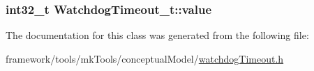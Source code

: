 \subsubsection[{\texorpdfstring{value}{value}}]{\setlength{\rightskip}{0pt plus 5cm}int32\+\_\+t Watchdog\+Timeout\+\_\+t\+::value\hspace{0.3cm}{\ttfamily [private]}}\hypertarget{class_watchdog_timeout__t_a347656fb77c201abda078eb2bd21186f}{}\label{class_watchdog_timeout__t_a347656fb77c201abda078eb2bd21186f}


The documentation for this class was generated from the following file\+:\begin{DoxyCompactItemize}
\item 
framework/tools/mk\+Tools/conceptual\+Model/\hyperlink{watchdog_timeout_8h}{watchdog\+Timeout.\+h}\end{DoxyCompactItemize}
